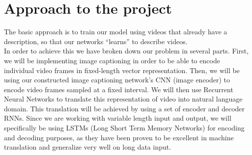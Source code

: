 \documentclass[12pt]{article}
\begin{document}
\section{Approach to the project}
		The basic approach is to train our model using videos that already have a description, so that our networks ``learns'' to describe videos.\\
		In order to achieve this we have broken down our problem in several parts. First, we will be implementing image captioning in order to be able to encode individual video frames in fixed-length vector representation.
		Then, we will be using our constructed image captioning network's CNN (image encoder) to encode video frames sampled at a fixed interval.
		We will then use Recurrent Neural Networks to translate this representation of video into natural language domain. This translation will be achieved by using a set of encoder and decoder RNNs. Since we are working with variable length input and output, we will specifically be using LSTMs (Long Short Term Memory Networks) for encoding and decoding purposes, as they have been proven to be excellent in machine translation and generalize very well on long data input.
\end{document}
